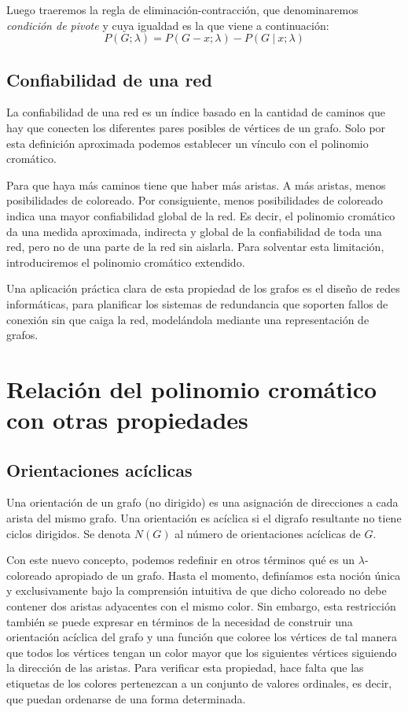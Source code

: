 \documentclass{article}
\numberwithin{figure}{section}
\begin{document}
Luego traeremos la regla de eliminación-contracción, que denominaremos \emph{condición de pivote} y cuya igualdad es la que viene a continuación:
\begin{equation*}
    P(G; \lambda) = P(G-x; \lambda) - P(G\ |\ x; \lambda)
\end{equation*}

\subsection{Confiabilidad de una red}

La confiabilidad de una red es un índice basado en la cantidad de caminos que hay que conecten los diferentes pares posibles de vértices de un grafo. Solo por esta definición aproximada podemos establecer un vínculo con el polinomio cromático.
    
Para que haya más caminos tiene que haber más aristas. A más aristas, menos posibilidades de coloreado. Por consiguiente, menos posibilidades de coloreado indica una mayor confiabilidad global de la red. Es decir, el polinomio cromático da una medida aproximada, indirecta y global de la confiabilidad de toda una red, pero no de una parte de la red sin aislarla. Para solventar esta limitación, introduciremos el polinomio cromático extendido.

Una aplicación práctica clara de esta propiedad de los grafos es el diseño de redes informáticas, para planificar los sistemas de redundancia que soporten fallos de conexión sin que caiga la red, modelándola mediante una representación de grafos.

\section{Relación del polinomio cromático con otras propiedades}

\subsection{Orientaciones acíclicas}

Una orientación de un grafo (no dirigido) es una asignación de direcciones a cada arista del mismo grafo. Una orientación es acíclica si el digrafo resultante no tiene ciclos dirigidos. Se denota $N(G)$ al número de orientaciones acíclicas de $G$.

Con este nuevo concepto, podemos redefinir en otros términos qué es un $\lambda$-coloreado apropiado de un grafo. Hasta el momento, definíamos esta noción única y exclusivamente bajo la comprensión intuitiva de que dicho coloreado no debe contener dos aristas adyacentes con el mismo color. Sin embargo, esta restricción también se puede expresar en términos de la necesidad de construir una orientación acíclica del grafo y una función que coloree los vértices de tal manera que todos los vértices tengan un color mayor que los siguientes vértices siguiendo la dirección de las aristas. Para verificar esta propiedad, hace falta que las etiquetas de los colores pertenezcan a un conjunto de valores ordinales, es decir, que puedan ordenarse de una forma determinada.
\end{document}
